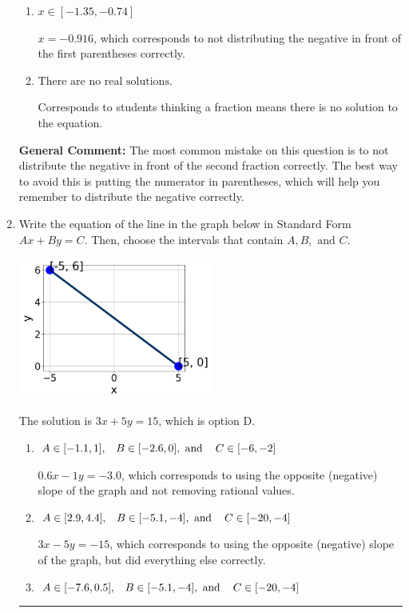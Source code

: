 \documentclass{extbook}[14pt]
\newcommand{\litem}[1]{\item #1

\rule{\textwidth}{0.4pt}}
\begin{document}
\begin{enumerate}
{\begin{enumerate}[label=\Alph*.]
* $x = -0.675$, which is the correct option.
\item \( x \in [-1.35, -0.74] \)

$x = -0.916$, which corresponds to not distributing the negative in front of the first parentheses correctly.
\item \( \text{There are no real solutions.} \)

Corresponds to students thinking a fraction means there is no solution to the equation.
\end{enumerate}

\textbf{General Comment:} The most common mistake on this question is to not distribute the negative in front of the second fraction correctly. The best way to avoid this is putting the numerator in parentheses, which will help you remember to distribute the negative correctly.
}
\litem{
Write the equation of the line in the graph below in Standard Form $Ax+By=C$. Then, choose the intervals that contain $A, B, \text{ and } C$.

\begin{center}
    \includegraphics[width=0.5\textwidth]{../Figures/linearGraphToStandardC.png}
\end{center}


The solution is \( 3x + 5y = 15 \), which is option D.\begin{enumerate}[label=\Alph*.]
\item \( A \in [-1.1, 1], \hspace{3mm} B \in [-2.6, 0], \text{ and } \hspace{3mm} C \in [-6, -2] \)

 $0.6x - 1y = -3.0$, which corresponds to using the opposite (negative) slope of the graph and not removing rational values.
\item \( A \in [2.9, 4.4], \hspace{3mm} B \in [-5.1, -4], \text{ and } \hspace{3mm} C \in [-20, -4] \)

 $3x - 5y = -15$, which corresponds to using the opposite (negative) slope of the graph, but did everything else correctly.
\item \( A \in [-7.6, 0.5], \hspace{3mm} B \in [-5.1, -4], \text{ and } \hspace{3mm} C \in [-20, -4] \)


\end{enumerate}}
\end{enumerate}
\end{document}
